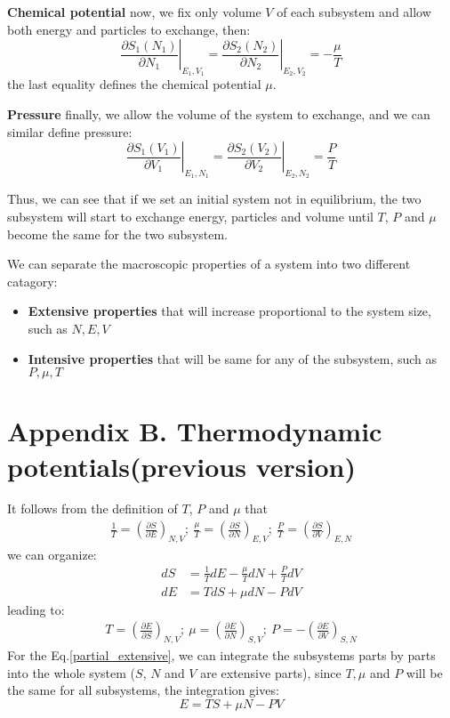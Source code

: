 \documentclass{article}
\begin{document}
\textbf{Chemical potential}
now, we fix only volume $V$ of each subsystem and allow both energy and particles to exchange, then:
\begin{equation}
    \left. \frac{\partial S_1(N_1)}{\partial N_1} \right|_{E_1,V_1} = \left. \frac{\partial S_2(N_2)}{\partial N_2}\right|_{E_2,V_2} = -\frac{\mu}{T}
\end{equation}
the last equality defines the chemical potential $\mu$. 

\textbf{Pressure}
finally, we allow the volume of the system to exchange, and we can similar define pressure:
\begin{equation}
    \left. \frac{\partial S_1(V_1)}{\partial V_1} \right|_{E_1,N_1} = \left. \frac{\partial S_2(V_2)}{\partial V_2}\right|_{E_2,N_2} = \frac{P}{T}
\end{equation}

Thus, we can see that if we set an initial system not in equilibrium, the two subsystem will
start to exchange energy, particles and volume until $T$, $P$ and $\mu$ become the same 
for the two subsystem. 

We can separate the macroscopic properties of a system into two different catagory:
\begin{itemize}
    \item \textbf{Extensive properties} that will increase proportional to the system size, such as $N,E,V$
    \item \textbf{Intensive properties} that will be same for any of the subsystem, such as  $P,\mu,T$
\end{itemize}

\newpage
\section*{Appendix B. Thermodynamic potentials(previous version)}

It follows from the definition of  $T$, $P$ and $\mu$ that 
\begin{gather}
    \frac{1}{T} = \left(\frac{\partial S}{\partial E}\right)_{N,V};\  
    \frac{\mu}{T} = \left(\frac{\partial S}{\partial N}\right)_{E,V};\ 
    \frac{P}{T} = \left(\frac{\partial S}{\partial V}\right)_{E,N}
\end{gather}
we can organize:
\begin{align}
    dS &= \frac{1}{T} dE - \frac{\mu}{T}dN + \frac{P}{T}dV \\
    dE &= TdS + \mu dN - P dV \label{partial_extensive}
\end{align}
leading to:
\begin{align}
    T = \left(\frac{\partial E}{\partial S}\right)_{N,V};\  
    \mu = \left(\frac{\partial E}{\partial N}\right)_{S,V};\ 
    P = -\left(\frac{\partial E}{\partial V}\right)_{S,N}
\end{align}
For the Eq.\ref{partial_extensive}, we can integrate the subsystems parts by parts into 
the whole system ($S$, $N$ and $V$ are extensive parts), 
since $T, \mu$ and $P$ will be the same for all subsystems, the integration
gives:
\begin{equation}
    E = TS + \mu N - PV \label{energy}
\end{equation}
\end{document}
